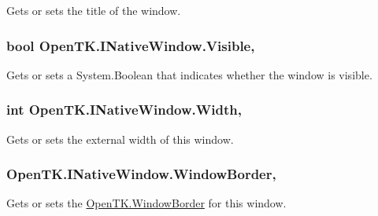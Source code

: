 Gets or sets the title of the window. 

\hypertarget{interface_open_t_k_1_1_i_native_window_ac455c50c69983d4a26e7ed61336290d8}{
\subsubsection[{Visible}]{\setlength{\rightskip}{0pt plus 5cm}bool Open\-T\-K.\-I\-Native\-Window.\-Visible\hspace{0.3cm}{\ttfamily [get]}, {\ttfamily [set]}}}\label{interface_open_t_k_1_1_i_native_window_ac455c50c69983d4a26e7ed61336290d8}


Gets or sets a System.\-Boolean that indicates whether the window is visible. 

\hypertarget{interface_open_t_k_1_1_i_native_window_a67659bdb41b907f0bbe9592e9a82d63f}{
\subsubsection[{Width}]{\setlength{\rightskip}{0pt plus 5cm}int Open\-T\-K.\-I\-Native\-Window.\-Width\hspace{0.3cm}{\ttfamily [get]}, {\ttfamily [set]}}}\label{interface_open_t_k_1_1_i_native_window_a67659bdb41b907f0bbe9592e9a82d63f}


Gets or sets the external width of this window. 

\hypertarget{interface_open_t_k_1_1_i_native_window_afb974cc1ffb686860725736bd07c2211}{
\subsubsection[{Window\-Border}]{ Open\-T\-K.\-I\-Native\-Window.\-Window\-Border\hspace{0.3cm}{\ttfamily [get]}, {\ttfamily [set]}}}\label{interface_open_t_k_1_1_i_native_window_afb974cc1ffb686860725736bd07c2211}


Gets or sets the \hyperlink{namespace_open_t_k_a20f46792b5471ff32362bd0a29fa5f1c}{Open\-T\-K.\-Window\-Border} for this window. 

